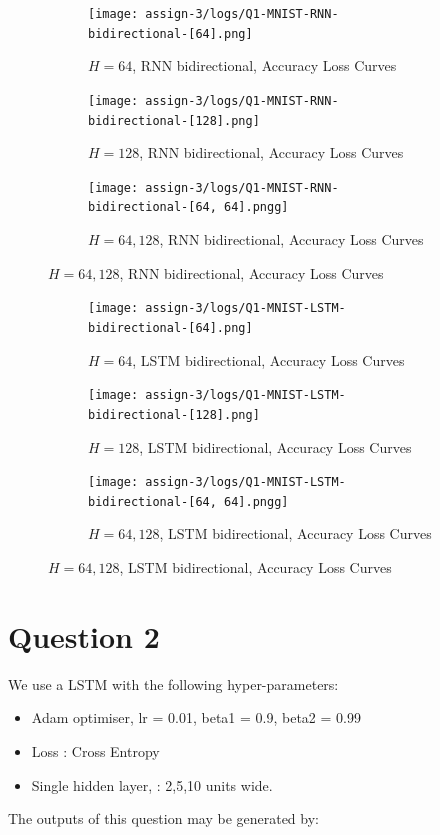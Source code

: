 \begin{figure}[!htbp]
\begin{subfigure}
\centering
\texttt{[image: assign-3/logs/Q1-MNIST-RNN-bidirectional-[64].png]}
\caption{$H=64$, RNN bidirectional, Accuracy Loss Curves}
\end{subfigure}
\begin{subfigure}
\centering
\texttt{[image: assign-3/logs/Q1-MNIST-RNN-bidirectional-[128].png]}
\caption{$H=128$, RNN bidirectional, Accuracy Loss Curves}
\end{subfigure}
\begin{subfigure}
\centering
\texttt{[image: assign-3/logs/Q1-MNIST-RNN-bidirectional-[64, 64].pngg]}
\caption{$H=64, 128$, RNN bidirectional, Accuracy Loss Curves}
\end{subfigure}
\end{figure}

\begin{figure}[!htbp]
\begin{subfigure}
\centering
\texttt{[image: assign-3/logs/Q1-MNIST-LSTM-bidirectional-[64].png]}
\caption{$H=64$, LSTM bidirectional, Accuracy Loss Curves}
\end{subfigure}
\begin{subfigure}
\centering
\texttt{[image: assign-3/logs/Q1-MNIST-LSTM-bidirectional-[128].png]}
\caption{$H=128$, LSTM bidirectional, Accuracy Loss Curves}
\end{subfigure}
\begin{subfigure}
\centering
\texttt{[image: assign-3/logs/Q1-MNIST-LSTM-bidirectional-[64, 64].pngg]}
\caption{$H=64, 128$, LSTM bidirectional, Accuracy Loss Curves}
\end{subfigure}
\end{figure}

\section{Question 2 }

We use a LSTM with the following hyper-parameters:

\begin{itemize}
\item  Adam optimiser, lr = 0.01, beta1 = 0.9, beta2 = 0.99
\item  Loss : Cross Entropy
\item  Single hidden layer, : 2,5,10 units wide.
\end{itemize}

The outputs of this question may be generated by:

